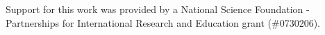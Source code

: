 Support for this work was provided by a National Science Foundation - Partnerships for International Research and Education grant (\#0730206).